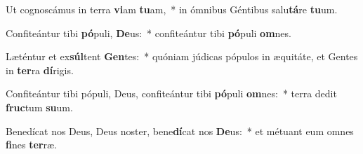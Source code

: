 \item Ut cognoscámus in terra \textbf{vi}am \textbf{tu}am,~* in ómnibus Géntibus salu\textbf{tá}re \textbf{tu}um.
\item Confiteántur tibi \textbf{pó}puli, \textbf{De}us:~* confiteántur tibi \textbf{pó}puli \textbf{om}nes.
\item Læténtur et ex\textbf{súl}tent \textbf{Gen}tes:~* quóniam júdicas pópulos in æquitáte, et Gentes in \textbf{ter}ra \textbf{dí}rigis.
\item Confiteántur tibi pópuli, Deus, confiteántur tibi \textbf{pó}puli \textbf{om}nes:~* terra dedit \textbf{fruc}tum \textbf{su}um.
\item Benedícat nos Deus, Deus noster, bene\textbf{dí}cat nos \textbf{De}us:~* et métuant eum omnes \textbf{fi}nes \textbf{ter}ræ.
